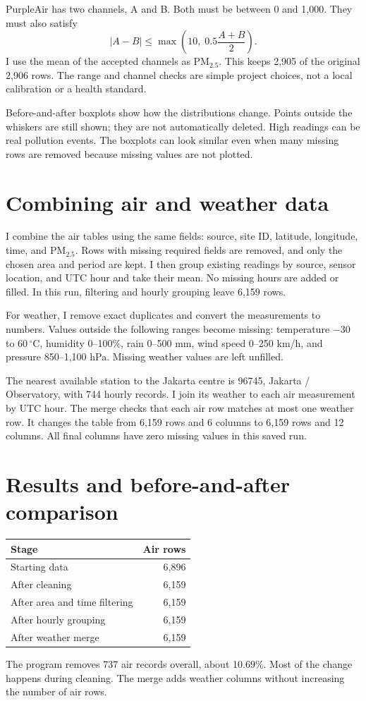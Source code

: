 \documentclass[11pt,a4paper]{article}
\begin{document}
PurpleAir has two channels, A and B. Both must be between 0 and 1,000. They must also satisfy
\[
|A-B|\leq\max\left(10,\;0.5\frac{A+B}{2}\right).
\]
I use the mean of the accepted channels as PM$_{2.5}$. This keeps 2,905 of the original 2,906 rows. The range and channel checks are simple project choices, not a local calibration or a health standard.

Before-and-after boxplots show how the distributions change. Points outside the whiskers are still shown; they are not automatically deleted. High readings can be real pollution events. The boxplots can look similar even when many missing rows are removed because missing values are not plotted.
\section{Combining air and weather data}
I combine the air tables using the same fields: source, site ID, latitude, longitude, time, and PM$_{2.5}$. Rows with missing required fields are removed, and only the chosen area and period are kept. I then group existing readings by source, sensor location, and UTC hour and take their mean. No missing hours are added or filled. In this run, filtering and hourly grouping leave 6,159 rows.

For weather, I remove exact duplicates and convert the measurements to numbers. Values outside the following ranges become missing: temperature $-30$ to $60\,^{\circ}$C, humidity 0--100\%, rain 0--500 mm, wind speed 0--250 km/h, and pressure 850--1,100 hPa. Missing weather values are left unfilled.

The nearest available station to the Jakarta centre is 96745, Jakarta / Observatory, with 744 hourly records. I join its weather to each air measurement by UTC hour. The merge checks that each air row matches at most one weather row. It changes the table from 6,159 rows and 6 columns to 6,159 rows and 12 columns. All final columns have zero missing values in this saved run.
\section{Results and before-and-after comparison}
\begin{center}
\begin{tabular}{lr}\toprule
Stage & Air rows \\\midrule
Starting data & 6,896 \\
After cleaning & 6,159 \\
After area and time filtering & 6,159 \\
After hourly grouping & 6,159 \\
After weather merge & 6,159 \\\bottomrule
\end{tabular}
\end{center}
The program removes 737 air records overall, about 10.69\%. Most of the change happens during cleaning. The merge adds weather columns without increasing the number of air rows.
\end{document}
